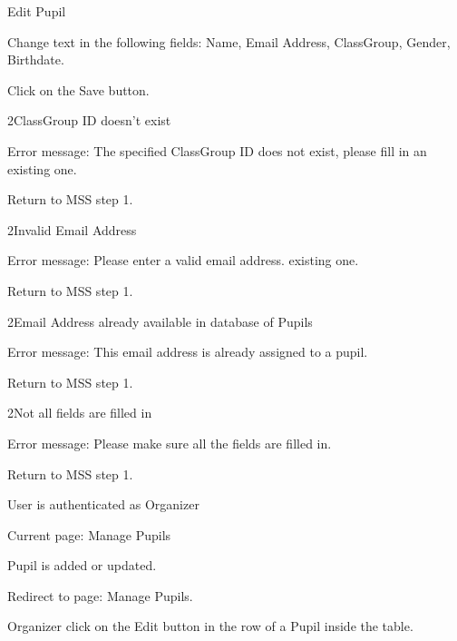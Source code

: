 
\begin{uc}{Edit Pupil}

    \begin{uc-mss}
    \item Change text in the following fields: Name, Email Address, ClassGroup,
        Gender, Birthdate.
    \item Click on the Save button.
    \end{uc-mss}

    \begin{uc-ext}

        \begin{uc-fail}{2}{ClassGroup ID doesn't exist}
        \item Error message: The specified ClassGroup ID does not exist, please
            fill in an existing one.
        \item Return to MSS step 1.
        \end{uc-fail}

        \begin{uc-fail}{2}{Invalid Email Address}
        \item Error message: Please enter a valid email address. existing one.
        \item Return to MSS step 1.
        \end{uc-fail}

        \begin{uc-fail}{2}{Email Address already available in database of
            Pupils}
        \item Error message: This email address is already assigned to a pupil.
        \item Return to MSS step 1.
        \end{uc-fail}

        \begin{uc-fail}{2}{Not all fields are filled in}
        \item Error message: Please make sure all the fields are filled in.
        \item Return to MSS step 1.
        \end{uc-fail}

    \end{uc-ext}

    \begin{uc-pre}
    \item User is authenticated as Organizer
    \item Current page: Manage Pupils
    \end{uc-pre}

    \begin{uc-post}
    \item Pupil is added or updated.
    \item Redirect to page: Manage Pupils.
    \end{uc-post}

    \begin{uc-trig}
        Organizer click on the Edit button in the row of a Pupil inside the
        table.
    \end{uc-trig}

\end{uc}
